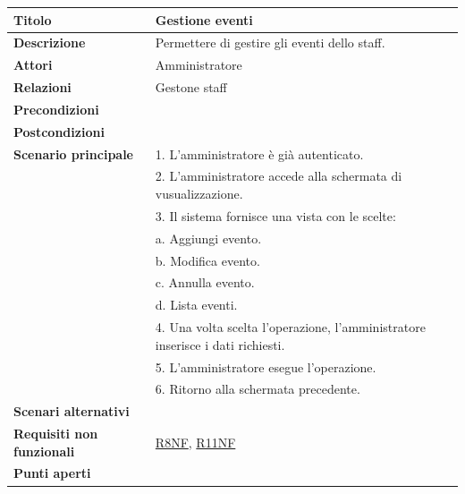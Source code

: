 \documentclass[a4paper]{article}
\begin{document}
\begin{center}
\begin{tabularx}{1\textwidth}{|l|X|}
    \hline
	\textbf{Titolo} & Gestione eventi \\
	\hline
	\textbf{Descrizione} & Permettere di gestire gli eventi dello staff. \\
	\hline
	\textbf{Attori} & Amministratore \\
	\hline
	\textbf{Relazioni} & Gestone staff \\
	\hline
	\textbf{Precondizioni} &  \\
	\hline
	\textbf{Postcondizioni} &  \\
	\hline
	\textbf{Scenario principale} & 1. L'amministratore è già autenticato.\\
	                             & 2. L'amministratore accede alla schermata di vusualizzazione. \\
								 & 3. Il sistema fornisce una vista con le scelte: \\
								 & \quad a. Aggiungi evento.\\
								 & \quad b. Modifica evento.\\
								 & \quad c. Annulla evento.\\
								 & \quad d. Lista eventi.\\
								 & 4. Una volta scelta l'operazione, l'amministratore inserisce i dati richiesti. \\
								 & 5. L'amministratore esegue l'operazione.\\
								 & 6. Ritorno alla schermata precedente.\\
	\hline
	\textbf{Scenari alternativi} & \\
	\hline
	\textbf{Requisiti non funzionali} & \hyperlink{R8NF}{R8NF}, \hyperlink{R11NF}{R11NF} \\
	\hline
	\textbf{Punti aperti} & \\
	\hline
\end{tabularx}
\end{center}

\end{document}
